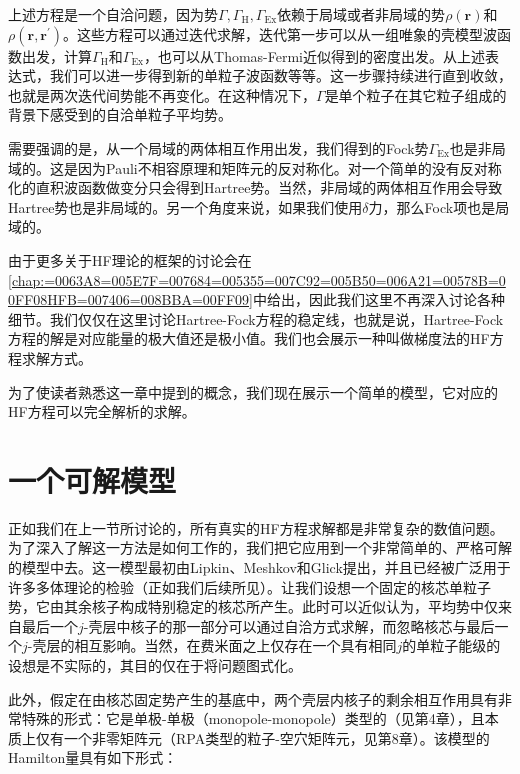上述方程是一个自洽问题，因为势$\Gamma,\Gamma_{\text{H}},\Gamma_{\text{Ex}}$依赖于局域或者非局域的势$\rho(\boldsymbol{r})$和$\rho(\boldsymbol{r},\boldsymbol{r}^{\prime})$。这些方程可以通过迭代求解，迭代第一步可以从一组唯象的壳模型波函数出发，计算$\Gamma_{\text{H}}$和$\Gamma_{\text{Ex}}$，也可以从Thomas-Fermi近似得到的密度出发。从上述表达式，我们可以进一步得到新的单粒子波函数等等。这一步骤持续进行直到收敛，也就是两次迭代间势能不再变化。在这种情况下，$\Gamma$是单个粒子在其它粒子组成的背景下感受到的自洽单粒子平均势。

需要强调的是，从一个局域的两体相互作用出发，我们得到的Fock势$\Gamma_{\text{Ex}}$也是非局域的。这是因为Pauli不相容原理和矩阵元的反对称化。对一个简单的没有反对称化的直积波函数做变分只会得到Hartree势。当然，非局域的两体相互作用会导致Hartree势也是非局域的。另一个角度来说，如果我们使用$\delta$力，那么Fock项也是局域的。

由于更多关于HF理论的框架的讨论会在\ref{chap:=0063A8=005E7F=007684=005355=007C92=005B50=006A21=00578B=00FF08HFB=007406=008BBA=00FF09}中给出，因此我们这里不再深入讨论各种细节。我们仅仅在这里讨论Hartree-Fock方程的稳定线，也就是说，Hartree-Fock方程的解是对应能量的极大值还是极小值。我们也会展示一种叫做梯度法的HF方程求解方式。

为了使读者熟悉这一章中提到的概念，我们现在展示一个简单的模型，它对应的HF方程可以完全解析的求解。

\section{一个可解模型\label{sec:=004E00=004E2A=0053EF=0089E3=006A21=00578B}\label{sec:5.4_Lipkin=006A21=00578B}}

正如我们在上一节所讨论的，所有真实的HF方程求解都是非常复杂的数值问题。为了深入了解这一方法是如何工作的，我们把它应用到一个非常简单的、严格可解的模型中去。这一模型最初由Lipkin、Meshkov和Glick提出\cite{LMG65}，并且已经被广泛用于许多多体理论的检验（正如我们后续所见）。让我们设想一个固定的核芯单粒子势，它由其余核子构成特别稳定的核芯所产生。此时可以近似认为，平均势中仅来自最后一个$j$-壳层中核子的那一部分可以通过自洽方式求解，而忽略核芯与最后一个$j$-壳层的相互影响。当然，在费米面之上仅存在一个具有相同$j$的单粒子能级的设想是不实际的，其目的仅在于将问题图式化。

此外，假定在由核芯固定势产生的基底中，两个壳层内核子的剩余相互作用具有非常特殊的形式：它是单极-单极（monopole-monopole）类型的（见第4章），且本质上仅有一个非零矩阵元（RPA类型的粒子-空穴矩阵元，见第8章）。该模型的Hamilton量具有如下形式：

